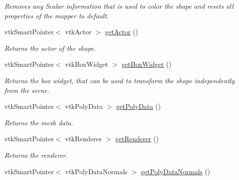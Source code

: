\begin{DoxyCompactItemize}
\begin{DoxyCompactList}\small\item\em Removes any Scalar information that is used to color the shape and resets all properties of the mapper to default. \end{DoxyCompactList}\item 
\hypertarget{class_shape_a9342c008eaa5d312df8927a81a77960b}{}vtk\+Smart\+Pointer$<$ vtk\+Actor $>$ \hyperlink{class_shape_a9342c008eaa5d312df8927a81a77960b}{get\+Actor} ()\label{class_shape_a9342c008eaa5d312df8927a81a77960b}

\begin{DoxyCompactList}\small\item\em Returns the actor of the shape. \end{DoxyCompactList}\item 
\hypertarget{class_shape_aa6623c3ec6545de8f2182551142386be}{}vtk\+Smart\+Pointer$<$ vtk\+Box\+Widget $>$ \hyperlink{class_shape_aa6623c3ec6545de8f2182551142386be}{get\+Box\+Widget} ()\label{class_shape_aa6623c3ec6545de8f2182551142386be}

\begin{DoxyCompactList}\small\item\em Returns the box widget, that can be used to transform the shape independently from the scene. \end{DoxyCompactList}\item 
\hypertarget{class_shape_a70b7e4429d766baf95cd24534eb1edb8}{}vtk\+Smart\+Pointer$<$ vtk\+Poly\+Data $>$ \hyperlink{class_shape_a70b7e4429d766baf95cd24534eb1edb8}{get\+Poly\+Data} ()\label{class_shape_a70b7e4429d766baf95cd24534eb1edb8}

\begin{DoxyCompactList}\small\item\em Returns the mesh data. \end{DoxyCompactList}\item 
\hypertarget{class_shape_aabee8928d7e05344678e4144f995f80b}{}vtk\+Smart\+Pointer$<$ vtk\+Renderer $>$ \hyperlink{class_shape_aabee8928d7e05344678e4144f995f80b}{get\+Renderer} ()\label{class_shape_aabee8928d7e05344678e4144f995f80b}

\begin{DoxyCompactList}\small\item\em Returns the renderer. \end{DoxyCompactList}\item 
\hypertarget{class_shape_a1fe4baf1f2a1223a48caa11dfc9914b1}{}vtk\+Smart\+Pointer$<$ vtk\+Poly\+Data\+Normals $>$ \hyperlink{class_shape_a1fe4baf1f2a1223a48caa11dfc9914b1}{get\+Poly\+Data\+Normals} ()\label{class_shape_a1fe4baf1f2a1223a48caa11dfc9914b1}


\end{DoxyCompactItemize}
